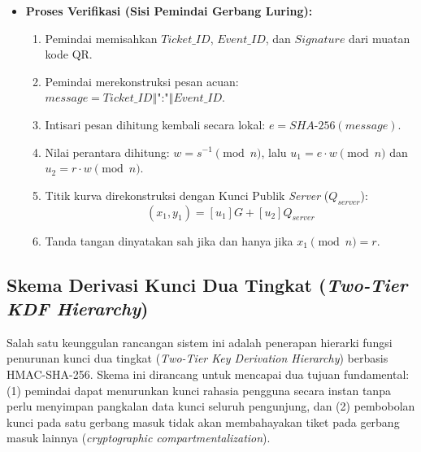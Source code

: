 \begin{itemize}
\begin{enumerate}
        \item Pasangan nilai $(r, s)$ masing-masing memiliki panjang 32 byte biner (total 64 byte), yang kemudian dikonversikan menjadi deret string heksadesimal sepanjang 128 karakter.
    \end{enumerate}
    \item \textbf{Proses Verifikasi (Sisi Pemindai Gerbang Luring):}
    \begin{enumerate}
        \item Pemindai memisahkan $Ticket\_ID$, $Event\_ID$, dan $Signature$ dari muatan kode QR.
        \item Pemindai merekonstruksi pesan acuan: $message = Ticket\_ID \mathbin{\Vert} \text{":"} \mathbin{\Vert} Event\_ID$.
        \item Intisari pesan dihitung kembali secara lokal: $e = SHA\text{-}256(message)$.
        \item Nilai perantara dihitung: $w = s^{-1} \pmod n$, lalu $u_1 = e \cdot w \pmod n$ dan $u_2 = r \cdot w \pmod n$.
        \item Titik kurva direkonstruksi dengan Kunci Publik \textit{Server} ($Q_{server}$):
        \begin{equation}
            (x_1, y_1) = [u_1]G + [u_2]Q_{server}
        \end{equation}
        \item Tanda tangan dinyatakan sah jika dan hanya jika $x_1 \pmod n = r$.
    \end{enumerate}
\end{itemize}

\subsection{Skema Derivasi Kunci Dua Tingkat (\textit{Two-Tier KDF Hierarchy})}
Salah satu keunggulan rancangan sistem ini adalah penerapan hierarki fungsi penurunan kunci dua tingkat (\textit{Two-Tier Key Derivation Hierarchy}) berbasis HMAC-SHA-256. Skema ini dirancang untuk mencapai dua tujuan fundamental: (1) pemindai dapat menurunkan kunci rahasia pengguna secara instan tanpa perlu menyimpan pangkalan data kunci seluruh pengunjung, dan (2) pembobolan kunci pada satu gerbang masuk tidak akan membahayakan tiket pada gerbang masuk lainnya (\textit{cryptographic compartmentalization}).

